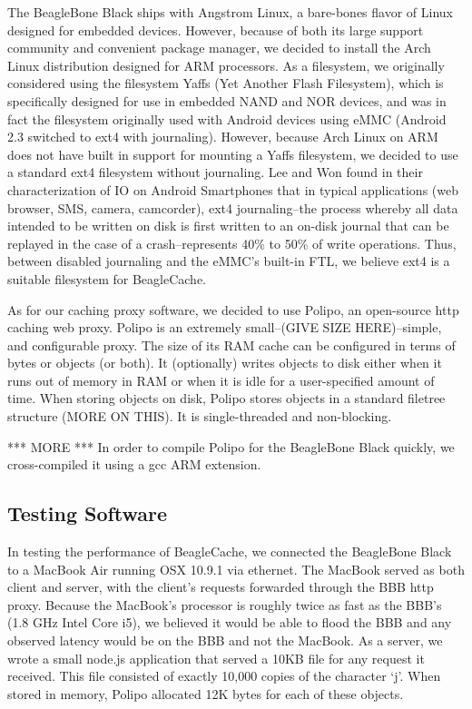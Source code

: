 \documentclass[pageno]{jpaper}
\begin{document}
The BeagleBone Black ships with Angstrom Linux, a bare-bones flavor of Linux designed for embedded devices.  However, because of both its large support community and convenient package manager, we decided to install the Arch Linux distribution designed for ARM processors\cite{alarm}.  As a filesystem, we originally considered using the filesystem Yaffs (Yet Another Flash Filesystem)\cite{yaffs}, which is specifically designed for use in embedded NAND and NOR devices, and was in fact the filesystem originally used with Android devices using eMMC (Android 2.3 switched to ext4 with journaling)\cite{ext4android}. However, because Arch Linux on ARM does not have built in support for mounting a Yaffs filesystem, we decided to use a standard ext4 filesystem without journaling. Lee and Won found in their characterization of IO on Android Smartphones that in typical applications (web browser, SMS, camera, camcorder), ext4 journaling--the process whereby all data intended to be written on disk is first written to an on-disk journal that can be replayed in the case of a crash\cite{ext4journal}--represents 40\% to 50\% of write operations\cite{ext4android}. Thus, between disabled journaling and the eMMC's built-in FTL, we believe ext4 is a suitable filesystem for BeagleCache.

As for our caching proxy software, we decided to use Polipo, an open-source http caching web proxy.  Polipo is an extremely small--(GIVE SIZE HERE)--simple, and configurable proxy.  The size of its RAM cache can be configured in terms of bytes or objects (or both).  It (optionally) writes objects to disk either when it runs out of memory in RAM or when it is idle for a user-specified amount of time.  When storing objects on disk, Polipo stores objects in a standard filetree structure (MORE ON THIS).  It is single-threaded and non-blocking. 

*** MORE *** In order to compile Polipo for the BeagleBone Black quickly, we cross-compiled it using a gcc ARM extension.

\subsection{Testing Software}

In testing the performance of BeagleCache, we connected the BeagleBone Black to a MacBook Air running OSX 10.9.1 via ethernet.  The MacBook served as both client and server, with the client's requests forwarded through the BBB http proxy. Because the MacBook's processor is roughly twice as fast as the BBB's (1.8 GHz Intel Core i5), we believed it would be able to flood the BBB and any observed latency would be on the BBB and not the MacBook.  As a server, we wrote a small node.js application that served a 10KB file for any request it received.  This file consisted of exactly 10,000 copies of the character `j'. When stored in memory, Polipo allocated 12K bytes for each of these objects. 
\end{document}
